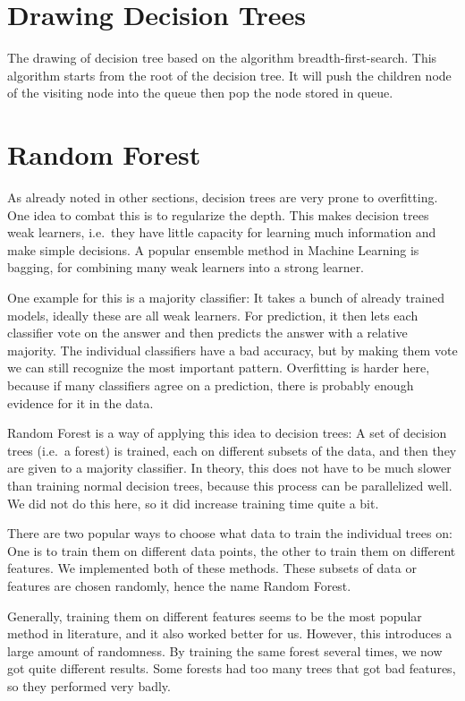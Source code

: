 \documentclass[a4paper]{article}
\begin{document}
\section{Drawing Decision Trees}
The drawing of decision tree based on the algorithm breadth-first-search. This algorithm starts from the root of the decision tree. It will push the children node of the visiting node into the queue then pop the node stored in queue.


\section{Random Forest}

As already noted in other sections, decision trees are very prone to overfitting. One idea to combat this is to regularize the depth. This makes decision trees weak learners, i.e.\ they have little capacity for learning much information and make simple decisions. A popular ensemble method in Machine Learning is bagging, for combining many weak learners into a strong learner.

One example for this is a majority classifier: It takes a bunch of already trained models, ideally these are all weak learners. For prediction, it then lets each classifier vote on the answer and then predicts the answer with a relative majority. The individual classifiers have a bad accuracy, but by making them vote we can still recognize the most important pattern. Overfitting is harder here, because if many classifiers agree on a prediction, there is probably enough evidence for it in the data.

Random Forest is a way of applying this idea to decision trees: A set of decision trees (i.e.\ a forest) is trained, each on different subsets of the data, and then they are given to a majority classifier. In theory, this does not have to be much slower than training normal decision trees, because this process can be parallelized well. We did not do this here, so it did increase training time quite a bit.

There are two popular ways to choose what data to train the individual trees on: One is to train them on different data points, the other to train them on different features. We implemented both of these methods. These subsets of data or features are chosen randomly, hence the name Random Forest.

Generally, training them on different features seems to be the most popular method in literature, and it also worked better for us. However, this introduces a large amount of randomness. By training the same forest several times, we now got quite different results. Some forests had too many trees that got bad features, so they performed very badly.
\end{document}
